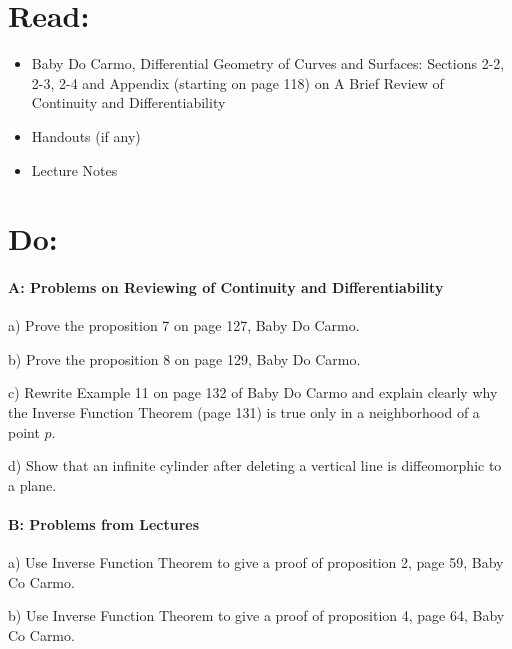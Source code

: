 \documentclass[12pt]{article}
\title{\rightline {\Huge {}}}
\author{\LARGE {HMC\quad Math 142 \quad Fall 2026} 
\\ {Prof. Gu}  
\\ {\LARGE Problem Set 5}}
\date{Start this assignment before Sunday night!}
\begin{document}
\maketitle

\section*{ Read: }

\begin{itemize}
	\item{Baby Do Carmo, Differential Geometry
		      of Curves and Surfaces:
		      Sections 2-2, 2-3, 2-4 and  Appendix (starting on page 118) on A Brief
		      Review of Continuity and Differentiability}
	\item{Handouts (if any)}
	\item{Lecture Notes}
\end{itemize}

\section*{ Do: }
\paragraph{A: Problems on Reviewing of Continuity and Differentiability}
\begin{itemize}
	{\item a) Prove the proposition 7 on page 127, Baby Do Carmo.}
	{\item b) Prove the proposition 8 on page 129, Baby Do Carmo.}
	{\item c) Rewrite Example 11 on page 132 of Baby Do Carmo and explain
		clearly why the Inverse Function Theorem (page 131) is true only in a
		neighborhood of a point $p$. }
	{\item d) Show that an infinite cylinder after deleting a vertical line is
		diffeomorphic to a plane.}
\end{itemize}

\medskip
\paragraph{B: Problems from Lectures}

\begin{itemize}
	{\item a) Use Inverse Function Theorem to give a proof
		of proposition 2, page 59, Baby Co Carmo.}

	{\item b) Use Inverse Function Theorem to give a proof
		of proposition 4, page 64, Baby Co Carmo.}
\end{itemize}
\end{document}
